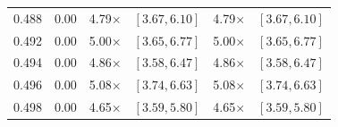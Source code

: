 \begin{table}[t]
\begin{tabular}{@{}lrrrrr@{}}
    0.488 & 0.00 & 4.79$\times$ & $[3.67, 6.10]$ & 4.79$\times$ & $[3.67, 6.10]$ \\
    0.492 & 0.00 & 5.00$\times$ & $[3.65, 6.77]$ & 5.00$\times$ & $[3.65, 6.77]$ \\
    0.494 & 0.00 & 4.86$\times$ & $[3.58, 6.47]$ & 4.86$\times$ & $[3.58, 6.47]$ \\
    0.496 & 0.00 & 5.08$\times$ & $[3.74, 6.63]$ & 5.08$\times$ & $[3.74, 6.63]$ \\
    0.498 & 0.00 & 4.65$\times$ & $[3.59, 5.80]$ & 4.65$\times$ & $[3.59, 5.80]$ \\
    \bottomrule
  \end{tabular}
\end{table}
